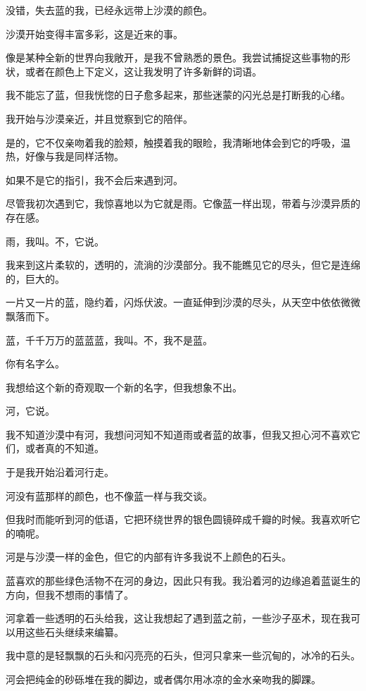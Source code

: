 \documentclass[UTF8]{article}
\begin{document}
\par 没错，失去蓝的我，已经永远带上沙漠的颜色。
\\[0.6cm]
\par 沙漠开始变得丰富多彩，这是近来的事。
\par 像是某种全新的世界向我敞开，是我不曾熟悉的景色。我尝试捕捉这些事物的形状，或者在颜色上下定义，这让我发明了许多新鲜的词语。
\par 我不能忘了蓝，但我恍惚的日子愈多起来，那些迷蒙的闪光总是打断我的心绪。
\par 我开始与沙漠亲近，并且觉察到它的陪伴。
\par 是的，它不仅亲吻着我的脸颊，触摸着我的眼睑，我清晰地体会到它的呼吸，温热，好像与我是同样活物。
\par 如果不是它的指引，我不会后来遇到河。
\par 尽管我初次遇到它，我惊喜地以为它就是雨。它像蓝一样出现，带着与沙漠异质的存在感。
\par 雨，我叫。不，它说。
\par 我来到这片柔软的，透明的，流淌的沙漠部分。我不能瞧见它的尽头，但它是连绵的，巨大的。
\par 一片又一片的蓝，隐约着，闪烁伏波。一直延伸到沙漠的尽头，从天空中依依微微飘落而下。
\par 蓝，千千万万的蓝蓝蓝，我叫。不，我不是蓝。
\par 你有名字么。
\par 我想给这个新的奇观取一个新的名字，但我想象不出。
\par 河，它说。
\par 我不知道沙漠中有河，我想问河知不知道雨或者蓝的故事，但我又担心河不喜欢它们，或者真的不知道。
\par 于是我开始沿着河行走。
\\[0.6cm]
\par 河没有蓝那样的颜色，也不像蓝一样与我交谈。
\par 但我时而能听到河的低语，它把环绕世界的银色圆镜碎成千瓣的时候。我喜欢听它的喃呢。
\par 河是与沙漠一样的金色，但它的内部有许多我说不上颜色的石头。
\par 蓝喜欢的那些绿色活物不在河的身边，因此只有我。我沿着河的边缘追着蓝诞生的方向，但我不想雨的事情了。
\par 河拿着一些透明的石头给我，这让我想起了遇到蓝之前，一些沙子巫术，现在我可以用这些石头继续来编纂。
\par 我中意的是轻飘飘的石头和闪亮亮的石头，但河只拿来一些沉甸的，冰冷的石头。
\par 河会把纯金的砂砾堆在我的脚边，或者偶尔用冰凉的金水亲吻我的脚踝。
\end{document}
